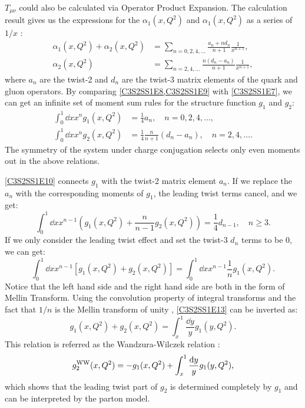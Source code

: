 $T_{\mu\nu}$ could also be calculated via Operator Product Expansion. The calculation result gives us the expressions for the $\alpha_1(x,Q^2)$ and $\alpha_1(x,Q^2)$ as a series of $1/x$ \cite{Jaffe1990}:
\begin{align} \label{C3S2SS1E8}
\alpha_1(x,Q^2)+\alpha_2(x,Q^2) & = \sum_{n=0,2,4,\dots}\frac{a_n+nd_n}{n+1}\frac{1}{x^{n+1}}, \\ \label{C3S2SS1E9}
\alpha_2(x,Q^2) & = \sum_{n=2,4,\dots}\frac{n(d_n-a_n)}{n+1}\frac{1}{x^{n+1}},
\end{align}
where $a_n$ are the twist-2 and $d_n$ are the twist-3 matrix elements of the quark and gluon operators. By comparing \cref{C3S2SS1E8,C3S2SS1E9} with \cref{C3S2SS1E7}, we can get an infinite set of moment sum rules for the structure function $g_1$ and $g_2$:
\begin{align} \label{C3S2SS1E10}
\int_0^1\dd{x}x^ng_1(x,Q^2) & = \frac{1}{4}a_n, \quad n = 0,2,4,\dots, \\ \label{C3S2SS1E11}
\int_0^1\dd{x}x^ng_2(x,Q^2) & = \frac{1}{4}\frac{n}{n+1}(d_n-a_n), \quad n = 2,4,\dots.
\end{align}
The symmetry of the system under charge conjugation selects only even moments out in the above relations.

\cref{C3S2SS1E10} connects $g_1$ with the twist-2 matrix element $a_n$. If we replace the $a_n$ with the corresponding moments of $g_1$, the leading twist terms cancel, and we get:
\begin{equation} \label{C3S2SS1E12}
\int_0^1\dd{x}x^{n-1}\left(g_1(x,Q^2)+\frac{n}{n-1}g_2(x,Q^2)\right) = \frac{1}{4}d_{n-1}, \quad n \geq 3.
\end{equation}
If we only consider the leading twist effect and set the twist-3 $d_n$ terms to be 0, we can get:
\begin{equation} \label{C3S2SS1E13}
\int_0^1\dd{x}x^{n-1}[g_1(x,Q^2)+g_2(x,Q^2)] = \int_0^1\dd{x}x^{n-1}\frac{1}{n}g_1(x,Q^2).
\end{equation}
Notice that the left hand side and the right hand side are both in the form of Mellin Transform. Using the convolution property of integral transforms and the fact that $1/n$ is the Mellin transform of unity \cite{Barone2003}, \cref{C3S2SS1E13} can be inverted as:
\begin{equation} \label{C3S2SS1E14}
g_1(x,Q^2)+g_2(x,Q^2) = \int_x^1\frac{\dd{y}}{y}g_1(y,Q^2).
\end{equation}
This relation is referred as the Wandzura-Wilczek relation \cite{Wandzura1977}:
\begin{equation} \label{C3S2SS1E15}
g_2^{\mathrm{WW}}(x,Q^2) = -g_1(x,Q^2)+\int_x^1\frac{\dd{y}}{y}g_1(y,Q^2),
\end{equation}
which shows that the leading twist part of $g_2$ is determined completely by $g_1$ and can be interpreted by the parton model.

